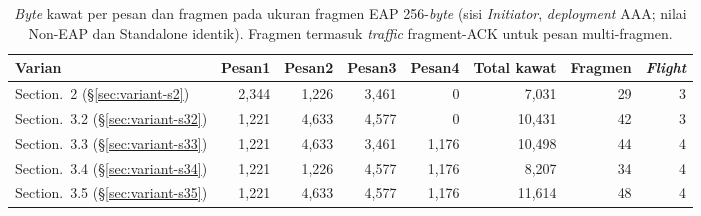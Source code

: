 \documentclass{easychair}
\newcommand{\VarSecShort}[1]{Section.~#1}
\begin{document}
\begin{table}[h]
\centering
\footnotesize
\caption{\emph{Byte} kawat per pesan dan fragmen pada ukuran fragmen
EAP 256-\emph{byte} (sisi \emph{Initiator}, \emph{deployment} AAA;
nilai Non-EAP dan Standalone identik). Fragmen termasuk \emph{traffic}
fragment-ACK untuk pesan multi-fragmen.}
\label{tab:frag}
\begin{tabular}{lrrrrrrr}
\toprule
\textbf{Varian} & \textbf{Pesan1} & \textbf{Pesan2} & \textbf{Pesan3} & \textbf{Pesan4} & \textbf{Total kawat} & \textbf{Fragmen} & \textbf{\emph{Flight}} \\
\midrule
\VarSecShort{2}   (\S\ref{sec:variant-s2})  & 2{,}344 & 1{,}226 & 3{,}461 & 0       &  7{,}031 & 29 & 3 \\
\VarSecShort{3.2} (\S\ref{sec:variant-s32}) & 1{,}221 & 4{,}633 & 4{,}577 & 0       & 10{,}431 & 42 & 3 \\
\VarSecShort{3.3} (\S\ref{sec:variant-s33}) & 1{,}221 & 4{,}633 & 3{,}461 & 1{,}176 & 10{,}498 & 44 & 4 \\
\VarSecShort{3.4} (\S\ref{sec:variant-s34}) & 1{,}221 & 1{,}226 & 4{,}577 & 1{,}176 &  8{,}207 & 34 & 4 \\
\VarSecShort{3.5} (\S\ref{sec:variant-s35}) & 1{,}221 & 4{,}633 & 4{,}577 & 1{,}176 & 11{,}614 & 48 & 4 \\
\bottomrule
\end{tabular}
\end{table}
\end{document}
